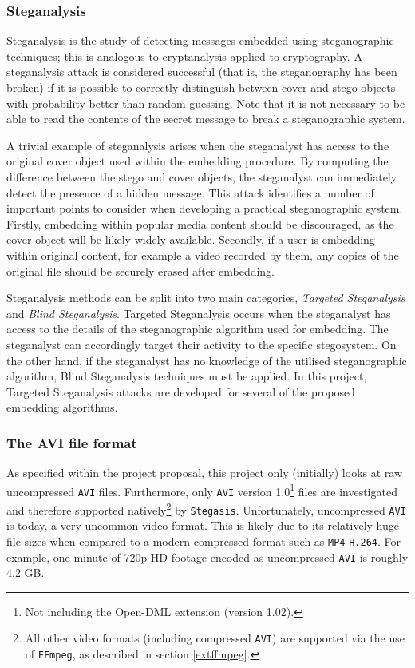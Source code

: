 \documentclass[paper=a4, fontsize=11pt,twoside]{scrartcl}    %
\numberwithin{table}{section}
\numberwithin{figure}{section}
\numberwithin{algorithm}{section}
\begin{document}
\subsubsection{Steganalysis}
Steganalysis is the study of detecting messages embedded using steganographic techniques; this is analogous to cryptanalysis applied to cryptography. A steganalysis attack is considered successful (that is, the steganography has been broken) if it is possible to correctly distinguish between cover and stego objects with probability better than random guessing. Note that it is not necessary to be able to read the contents of the secret message to break a steganographic system.

A trivial example of steganalysis arises when the steganalyst has access to the original cover object used within the embedding procedure. By computing the difference between the stego and cover objects, the steganalyst can immediately detect the presence of a hidden message. This attack identifies a number of important points to consider when developing a practical steganographic system. Firstly, embedding within popular media content should be discouraged, as the cover object will be likely widely available. Secondly, if a user is embedding within original content, for example a video recorded by them, any copies of the original file should be securely erased after embedding.

Steganalysis methods can be split into two main categories, \textit{Targeted Steganalysis} and \textit{Blind Steganalysis}. Targeted Steganalysis occurs when the steganalyst has access to the details of the steganographic algorithm used for embedding. The steganalyst can accordingly target their activity to the specific stegosystem. On the other hand, if the steganalyst has no knowledge of the utilised steganographic algorithm, Blind Steganalysis techniques must be applied. In this project, Targeted Steganalysis attacks are developed for several of the proposed embedding algorithms.

\subsubsection{The AVI file format}
\label{avi}
As specified within the project proposal, this project only (initially) looks at raw uncompressed \texttt{AVI} files. Furthermore, only \texttt{AVI} version 1.0\footnote{Not including the Open-DML extension (version 1.02).} files are investigated and therefore supported natively\footnote{All other video formats (including compressed \texttt{AVI}) are supported via the use of \texttt{FFmpeg}, as described in section \ref{extffmpeg}.} by \texttt{Stegasis}. Unfortunately, uncompressed \texttt{AVI} is today, a very uncommon video format. This is likely due to its relatively huge file sizes when compared to a modern compressed format such as \texttt{MP4} \texttt{H.264}. For example, one minute of 720p HD footage encoded as uncompressed \texttt{AVI} is roughly 4.2 GB.
\end{document}
